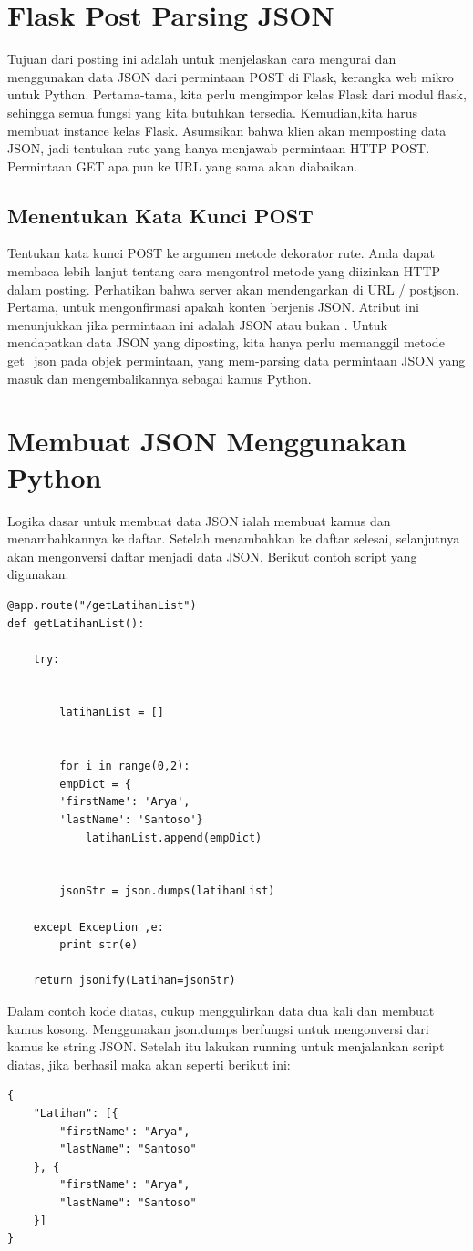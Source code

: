 \section{Flask Post Parsing JSON}
Tujuan dari posting ini adalah untuk menjelaskan cara mengurai dan menggunakan data JSON dari permintaan POST di Flask, kerangka web mikro untuk Python. Pertama-tama, kita perlu mengimpor kelas Flask dari modul flask, sehingga semua fungsi yang kita butuhkan tersedia. Kemudian,kita harus membuat instance kelas Flask. Asumsikan bahwa klien akan memposting data JSON, jadi tentukan rute yang hanya menjawab permintaan HTTP POST. Permintaan GET apa pun ke URL yang sama akan diabaikan\cite{dwyer2016flask}.

\subsection{Menentukan Kata Kunci POST}
Tentukan kata kunci POST ke argumen metode dekorator rute. Anda dapat membaca lebih lanjut tentang cara mengontrol metode yang diizinkan HTTP dalam posting. Perhatikan  bahwa server akan mendengarkan di URL / postjson.  Pertama, untuk mengonfirmasi apakah konten berjenis JSON. Atribut ini menunjukkan jika permintaan ini adalah JSON atau bukan . Untuk mendapatkan data JSON yang diposting, kita hanya perlu memanggil metode get_json pada objek permintaan, yang mem-parsing data permintaan JSON yang masuk dan mengembalikannya sebagai kamus Python\cite{dwyer2016flask}.

\section{Membuat JSON Menggunakan Python}
Logika dasar untuk membuat data JSON ialah membuat kamus dan menambahkannya ke daftar. Setelah menambahkan ke daftar selesai, selanjutnya akan mengonversi daftar menjadi data JSON. Berikut contoh script yang digunakan:
\begin{verbatim}
@app.route("/getLatihanList")
def getLatihanList():

    try:


        latihanList = []


        for i in range(0,2):
        empDict = {
        'firstName': 'Arya',
        'lastName': 'Santoso'}
            latihanList.append(empDict)


        jsonStr = json.dumps(latihanList)

    except Exception ,e:
        print str(e)

    return jsonify(Latihan=jsonStr)
\end{verbatim}
Dalam contoh kode diatas, cukup menggulirkan data dua kali dan membuat kamus kosong. Menggunakan json.dumps berfungsi untuk mengonversi dari kamus ke string JSON. Setelah itu lakukan running untuk menjalankan script diatas, jika berhasil maka akan seperti berikut ini:
\begin{verbatim}
{
    "Latihan": [{
        "firstName": "Arya",
        "lastName": "Santoso"
    }, {
        "firstName": "Arya",
        "lastName": "Santoso"
    }]
}
\end{verbatim}

